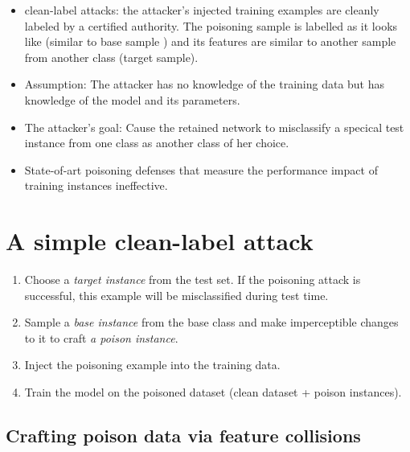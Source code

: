 \documentclass[11pt]{article}
\numberwithin{equation}{section}
\begin{document}
\begin{itemize}
    \item clean-label attacks: the attacker’s injected training examples are cleanly labeled by a certified authority. {\color{blue} The poisoning sample is labelled as it looks like (similar to base sample ) and its features are similar to another sample from another class (target sample).}
    \item Assumption: The attacker has no knowledge of the training data but has knowledge of the model and its parameters.{\color{blue}{ (Many classic networks pretrained on standard datasets, such as ResNet or Inception trained on ImageNet.)}}
    \item The attacker's goal: Cause the retained network to misclassify a specical test instance from one class as another class of her choice.{\color{blue}{ Retrain the network on the augmented data set that includes poison instances.}}
    \item State-of-art poisoning defenses that measure the performance impact of training instances ineffective.{\color{blue}{ Besides the intended misprediction on the target, the performance degradation on the victim classifier is not noticeable.}}
\end{itemize}


\section{A simple clean-label attack}

\begin{enumerate}
    \item {\color{red}{(Attacker)}} Choose a \textit{target instance} from the test set. If the poisoning attack is successful, this example will be misclassified during test time.
    \item {\color{red}{(Attacker)}} Sample a \textit{base instance} from the base class and make imperceptible changes to it to craft \textit{a poison instance}. 
    \item Inject the poisoning example into the training data.
    \item Train the model on the poisoned dataset (clean dataset + poison instances).
\end{enumerate}

\subsection{Crafting poison data via feature collisions}
\end{document}
